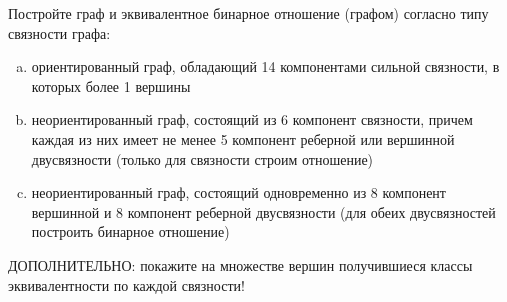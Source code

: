 \question 
Постройте граф и эквивалентное бинарное отношение (графом) согласно типу связности графа:\\
\begin{enumerate} [a)]\setcounter{enumi}{0}
\item ориентированный граф, обладающий 14 компонентами сильной связности, в которых более 1 вершины
\item неориентированный граф, состоящий из 6 компонент связности, причем каждая из них имеет не менее 5 компонент реберной или вершинной двусвязности (только для связности строим отношение)
\item неориентированный граф, состоящий одновременно из 8 компонент вершинной и 8 компонент реберной двусвязности (для обеих двусвязностей построить бинарное отношение)
\end{enumerate} 
ДОПОЛНИТЕЛЬНО: покажите на множестве вершин получившиеся классы эквивалентности по каждой связности!